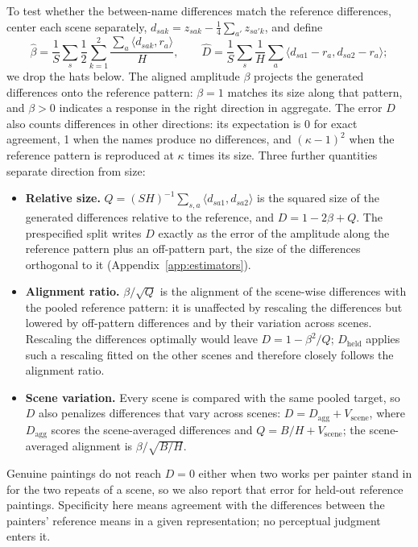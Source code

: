 \documentclass[10pt]{article}
\newcommand{\ip}[2]{\langle #1,#2\rangle}
\begin{document}
To test whether the between-name differences match the reference differences, center each scene
separately, $d_{sak}=z_{sak}-\frac14\sum_{a'}z_{sa'k}$, and define
\begin{equation}
\widehat\beta=\frac1S\sum_s\frac{1}{2}\sum_{k=1}^2\frac{\sum_a\ip{d_{sak}}{r_a}}{H},\qquad
\widehat D=\frac1S\sum_s\frac1H\sum_a\ip{d_{sa1}-r_a}{d_{sa2}-r_a};
\label{eq:beta-d}
\end{equation}
we drop the hats below. The aligned amplitude $\beta$ projects the generated differences onto the
reference pattern: $\beta=1$ matches its size along that pattern, and $\beta>0$ indicates a
response in the right direction in aggregate. The error $D$ also counts differences in other
directions: its expectation is 0 for exact agreement, 1 when the names produce no differences, and
$(\kappa-1)^2$ when the reference pattern is reproduced at $\kappa$ times its size. Three further
quantities separate direction from size:
\begin{itemize}
\item \textbf{Relative size.} $Q=(SH)^{-1}\sum_{s,a}\ip{d_{sa1}}{d_{sa2}}$ is the squared size of
the generated differences relative to the reference, and $D=1-2\beta+Q$. The prespecified split
writes $D$ exactly as the error of the amplitude along the reference pattern plus an off-pattern
part, the size of the differences orthogonal to it (Appendix~\ref{app:estimators}).
\item \textbf{Alignment ratio.} $\beta/\sqrt{Q}$ is the alignment of the scene-wise differences
with the pooled reference pattern: it is unaffected by rescaling the differences but lowered by
off-pattern differences and by their variation across scenes. Rescaling the differences optimally
would leave $D=1-\beta^2/Q$; $D_{\mathrm{held}}$ applies such a rescaling fitted on the other
scenes and therefore closely follows the alignment ratio.
\item \textbf{Scene variation.} Every scene is compared with the same pooled target, so $D$ also
penalizes differences that vary across scenes: $D=D_{\mathrm{agg}}+V_{\mathrm{scene}}$, where
$D_{\mathrm{agg}}$ scores the scene-averaged differences and $Q=B/H+V_{\mathrm{scene}}$; the
scene-averaged alignment is $\beta/\sqrt{B/H}$.
\end{itemize}
Genuine paintings do not reach $D=0$ either when two works per painter stand in for the two
repeats of a scene, so we also report that error for held-out reference paintings. Specificity
here means agreement with the differences between the painters' reference means in a given
representation; no perceptual judgment enters it.
\end{document}
